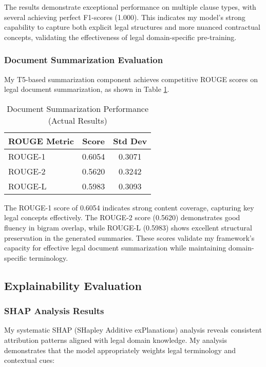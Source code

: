 The results demonstrate exceptional performance on multiple clause types, with several achieving perfect F1-scores (1.000). This indicates my model's strong capability to capture both explicit legal structures and more nuanced contractual concepts, validating the effectiveness of legal domain-specific pre-training.

\subsubsection{Document Summarization Evaluation}
My T5-based summarization component achieves competitive ROUGE scores on legal document summarization, as shown in Table \ref{tab:summarization_results}.

\begin{table}[ht]
\centering
\caption{Document Summarization Performance (Actual Results)}
\label{tab:summarization_results}
\begin{tabular}{|l|c|c|}
\hline
\textbf{ROUGE Metric} & \textbf{Score} & \textbf{Std Dev} \\
\hline
ROUGE-1 & 0.6054 & 0.3071 \\
ROUGE-2 & 0.5620 & 0.3242 \\
ROUGE-L & 0.5983 & 0.3093 \\
\hline
\end{tabular}
\end{table}

The ROUGE-1 score of 0.6054 indicates strong content coverage, capturing key legal concepts effectively. The ROUGE-2 score (0.5620) demonstrates good fluency in bigram overlap, while ROUGE-L (0.5983) shows excellent structural preservation in the generated summaries. These scores validate my framework's capacity for effective legal document summarization while maintaining domain-specific terminology.

\subsection{Explainability Evaluation}
\label{subsec:explainability_evaluation}

\subsubsection{SHAP Analysis Results}
My systematic SHAP (SHapley Additive exPlanations) analysis reveals consistent attribution patterns aligned with legal domain knowledge. My analysis demonstrates that the model appropriately weights legal terminology and contextual cues:

